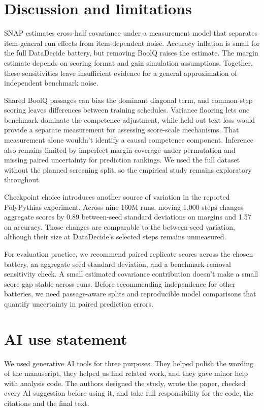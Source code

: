 \documentclass{article}
\begin{document}
\section{Discussion and limitations}
SNAP estimates cross-half covariance under a measurement model that separates item-general run effects from item-dependent noise. Accuracy inflation is small for the full DataDecide battery, but removing BoolQ raises the estimate. The margin estimate depends on scoring format and gain simulation assumptions. Together, these sensitivities leave insufficient evidence for a general approximation of independent benchmark noise.

Shared BoolQ passages can bias the dominant diagonal term, and common-step scoring leaves differences between training schedules. Variance flooring lets one benchmark dominate the competence adjustment, while held-out text loss would provide a separate measurement for assessing score-scale mechanisms. That measurement alone wouldn't identify a causal competence component. Inference also remains limited by imperfect margin coverage under permutation and missing paired uncertainty for prediction rankings. We used the full dataset without the planned screening split, so the empirical study remains exploratory throughout.

Checkpoint choice introduces another source of variation in the reported PolyPythias experiment. Across nine 160M runs, moving 1,000 steps changes aggregate scores by 0.89 between-seed standard deviations on margins and 1.57 on accuracy. Those changes are comparable to the between-seed variation, although their size at DataDecide's selected steps remains unmeasured.

For evaluation practice, we recommend paired replicate scores across the chosen battery, an aggregate seed standard deviation, and a benchmark-removal sensitivity check. A small estimated covariance contribution doesn't make a small score gap stable across runs. Before recommending independence for other batteries, we need passage-aware splits and reproducible model comparisons that quantify uncertainty in paired prediction errors.

\label{maintext:end}
\section*{AI use statement}
We used generative AI tools for three purposes. They helped polish the wording of the manuscript, they helped us find related work, and they gave minor help with analysis code. The authors designed the study, wrote the paper, checked every AI suggestion before using it, and take full responsibility for the code, the citations and the final text.
\end{document}
